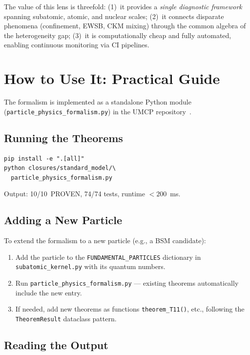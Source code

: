 \documentclass[
  aps,
  prd,
  twocolumn,
  superscriptaddress,
  nofootinbib,
  floatfix
]{revtex4-2}
\begin{document}
The value of this lens is threefold:
(1)~it provides a \emph{single diagnostic framework} spanning
subatomic, atomic, and nuclear scales;
(2)~it connects disparate phenomena (confinement, EWSB, CKM mixing)
through the common algebra of the heterogeneity gap;
(3)~it is computationally cheap and fully automated, enabling
continuous monitoring via CI pipelines.

\section{How to Use It: Practical Guide}\label{sec:howto}

The formalism is implemented as a standalone Python module
(\texttt{particle\_physics\_formalism.py}) in the UMCP
repository~\cite{umcpmetadatarepo}.

\subsection{Running the Theorems}

\begin{verbatim}
pip install -e ".[all]"
python closures/standard_model/\
  particle_physics_formalism.py
\end{verbatim}

Output: 10/10~PROVEN, 74/74 tests, runtime $< 200$~ms.

\subsection{Adding a New Particle}

To extend the formalism to a new particle (e.g., a BSM candidate):

\begin{enumerate}
\item Add the particle to the \texttt{FUNDAMENTAL\_PARTICLES}
  dictionary in \texttt{subatomic\_kernel.py} with its
  quantum numbers.
\item Run \texttt{particle\_physics\_formalism.py} ---
  existing theorems automatically include the new entry.
\item If needed, add new theorems as functions
  \texttt{theorem\_T11()}, etc., following the
  \texttt{TheoremResult} dataclass pattern.
\end{enumerate}

\subsection{Reading the Output}
\end{document}

